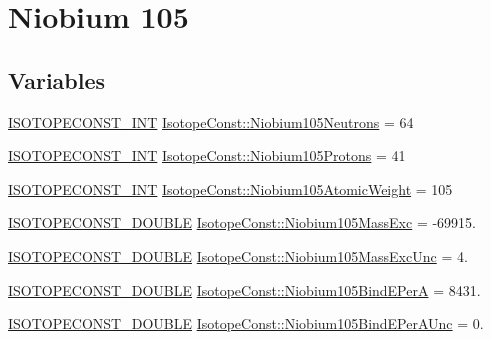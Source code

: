 \hypertarget{group___isotope_const-_niobium-_nb105}{}\section{Niobium 105}
\label{group___isotope_const-_niobium-_nb105}
\subsection*{Variables}
\begin{DoxyCompactItemize}
\item 
\mbox{\hyperlink{group___isotope_const-_macros_ga5f18360b3e99483a35c32d789e62621c}{I\+S\+O\+T\+O\+P\+E\+C\+O\+N\+S\+T\+\_\+\+I\+NT}} \mbox{\hyperlink{group___isotope_const-_niobium-_nb105_ga3caac8b6bc524e8340179c601ce8e671}{Isotope\+Const\+::\+Niobium105\+Neutrons}} = 64
\item 
\mbox{\hyperlink{group___isotope_const-_macros_ga5f18360b3e99483a35c32d789e62621c}{I\+S\+O\+T\+O\+P\+E\+C\+O\+N\+S\+T\+\_\+\+I\+NT}} \mbox{\hyperlink{group___isotope_const-_niobium-_nb105_ga54a39dbb0777fe2a80de8095c16c50e9}{Isotope\+Const\+::\+Niobium105\+Protons}} = 41
\item 
\mbox{\hyperlink{group___isotope_const-_macros_ga5f18360b3e99483a35c32d789e62621c}{I\+S\+O\+T\+O\+P\+E\+C\+O\+N\+S\+T\+\_\+\+I\+NT}} \mbox{\hyperlink{group___isotope_const-_niobium-_nb105_gaf3ed39158c5590fdd571b5c506982c17}{Isotope\+Const\+::\+Niobium105\+Atomic\+Weight}} = 105
\item 
\mbox{\hyperlink{group___isotope_const-_macros_ga8f45a7272ce02c0b4c65c44636ed719a}{I\+S\+O\+T\+O\+P\+E\+C\+O\+N\+S\+T\+\_\+\+D\+O\+U\+B\+LE}} \mbox{\hyperlink{group___isotope_const-_niobium-_nb105_gafc245ae19910958cf9c54fa95f027ead}{Isotope\+Const\+::\+Niobium105\+Mass\+Exc}} = -\/69915.
\item 
\mbox{\hyperlink{group___isotope_const-_macros_ga8f45a7272ce02c0b4c65c44636ed719a}{I\+S\+O\+T\+O\+P\+E\+C\+O\+N\+S\+T\+\_\+\+D\+O\+U\+B\+LE}} \mbox{\hyperlink{group___isotope_const-_niobium-_nb105_gaf82eae1ac759bee013eb094252b4531d}{Isotope\+Const\+::\+Niobium105\+Mass\+Exc\+Unc}} = 4.
\item 
\mbox{\hyperlink{group___isotope_const-_macros_ga8f45a7272ce02c0b4c65c44636ed719a}{I\+S\+O\+T\+O\+P\+E\+C\+O\+N\+S\+T\+\_\+\+D\+O\+U\+B\+LE}} \mbox{\hyperlink{group___isotope_const-_niobium-_nb105_ga52ad13436a3a42f48baeeaf2083334d0}{Isotope\+Const\+::\+Niobium105\+Bind\+E\+PerA}} = 8431.
\item 
\mbox{\hyperlink{group___isotope_const-_macros_ga8f45a7272ce02c0b4c65c44636ed719a}{I\+S\+O\+T\+O\+P\+E\+C\+O\+N\+S\+T\+\_\+\+D\+O\+U\+B\+LE}} \mbox{\hyperlink{group___isotope_const-_niobium-_nb105_ga72c70179b9e5125d2319a0d7aee1f039}{Isotope\+Const\+::\+Niobium105\+Bind\+E\+Per\+A\+Unc}} = 0.

\end{DoxyCompactItemize}
